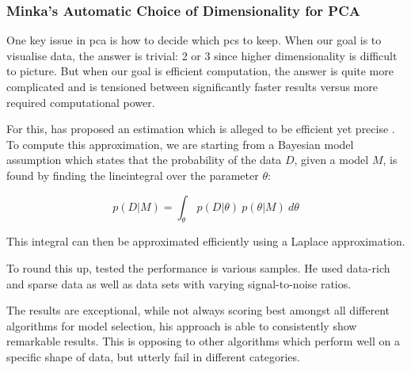 
\clearpage


\subsubsection{Minka's Automatic Choice of Dimensionality for PCA} \label{sec:mle}

One key issue in \acrlong{pca} is how to decide which \glspl{pc} to keep.
When our goal is to visualise data, the answer is trivial: 2 or 3 since higher dimensionality is difficult to picture.
But when our goal is efficient computation, the answer is quite more complicated and is tensioned between significantly faster results versus more required computational power.
\bigskip


For this, \citeauthor{minka2000automatic} has proposed an estimation which is alleged to be efficient yet precise \cite{minka2000automatic}.
To compute this approximation, we are starting from a Bayesian model assumption which states that the probability of the data $D$, given a model $M$, is found by finding the \gls{lineintegral} over the parameter $\theta$:

\begin{equation}
	\label{formula:minkaMLE}
	p(D | M) = \int_\theta \ p(D | \theta)\ p(\theta | M)\ d\theta
\end{equation}

\medskip\noindent
This integral can then be approximated efficiently using a Laplace approximation.
\bigskip

To round this up, \citeauthor{minka2000automatic} tested the performance is various samples.
He used data-rich and sparse data as well as data sets with varying signal-to-noise ratios.

The results are exceptional, while not always scoring best amongst all different algorithms for model selection, his approach is able to consistently show remarkable results.
This is opposing to other algorithms which perform well on a specific shape of data, but utterly fail in different categories.



